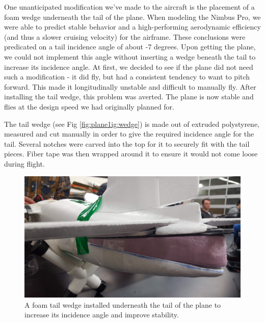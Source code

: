 \documentclass[]{auvsi_doc}
\begin{document}
One unanticipated modification we've made to the aircraft is the placement of a foam wedge underneath the tail of the plane. When modeling the Nimbus Pro, we were able to predict stable behavior and a high-performing aerodynamic efficiency (and thus a slower cruising velocity) for the airframe. These conclusions were predicated on a tail incidence angle of about -7 degrees. Upon getting the plane, we could not implement this angle without inserting a wedge beneath the tail to increase its incidence angle. At first, we decided to see if the plane did not need such a modification - it did fly, but had a consistent tendency to want to pitch forward. This made it longitudinally unstable and difficult to manually fly. After installing the tail wedge, this problem was averted. The plane is now stable and flies at the design speed we had originally planned for.

The tail wedge (see Fig \ref{fig:plane1ig:wedge}) is made out of extruded polystyrene, measured and cut manually in order to give the required incidence angle for the tail. Several notches were carved into the top for it to securely fit with the tail pieces. Fiber tape was then wrapped around it to ensure it would not come loose during flight.

\begin{figure}[h!]
	\centering
	\includegraphics[width=.75\columnwidth]{tailwedge}
	\caption{A foam tail wedge installed underneath the tail of the plane to increase its incidence angle and improve stability.}
	\label{fig:wedge}
\end{figure}
\end{document}
